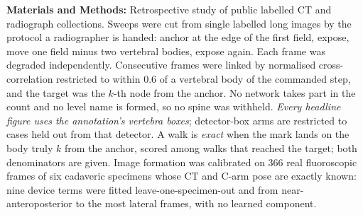 \documentclass[11pt,letterpaper]{article}
\begin{document}
\noindent\textbf{Materials and Methods:} Retrospective study of public labelled CT and radiograph
collections. Sweeps were cut from single labelled long images by the protocol a radiographer is handed:
anchor at the edge of the first field, expose, move one field minus two vertebral bodies, expose again.
Each frame was degraded independently. Consecutive frames were linked by normalised cross-correlation
restricted to within 0.6 of a vertebral body of the commanded step, and the target was the $k$-th node from
the anchor. No network takes part in the count and no level name is formed, so no spine was withheld.
\emph{Every headline figure uses the annotation's vertebra boxes}; detector-box arms are restricted to
cases held out from that detector. A walk is \emph{exact} when the mark lands on the body truly $k$ from
the anchor, scored among walks that reached the target; both denominators are given. Image formation
was calibrated on 366 real fluoroscopic frames of six cadaveric specimens whose CT and C-arm pose are
exactly known: nine device terms were fitted leave-one-specimen-out and from near-anteroposterior to the
most lateral frames, with no learned component.
\end{document}
